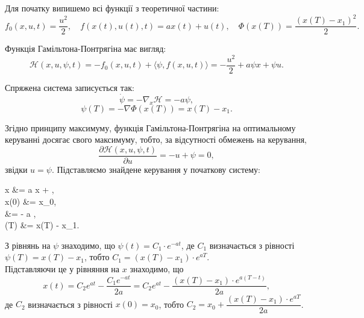 \begin{solution}
	Для початку випишемо всі функції з теоретичної частини:
	\begin{equation}
		f_0(x, u, t) = \dfrac{u^2}{2}, \quad f(x(t), u(t), t) = a x(t) + u(t), \quad \Phi(x(T)) = \dfrac{(x(T) - x_1)^2}{2}.
	\end{equation}

	Функція Гамільтона-Понтрягіна має вигляд:
	\begin{equation}
		\mathcal{H}(x, u, \psi, t) = - f_0(x, u, t) + \langle \psi, f(x, u, t) \rangle = - \dfrac{u^2}{2} + a \psi x + \psi u.
	\end{equation}

	Спряжена система записується так:
	\begin{equation}
		\dot \psi = - \nabla_x \mathcal{H} = - a \psi,
	\end{equation}
	\begin{equation}
		\psi(T) = - \nabla \Phi(x(T)) = x(T) - x_1.
	\end{equation}

	Згідно принципу максимуму, функція Гамільтона-Понтрягіна на оптимальному керуванні досягає свого максимуму, тобто, за відсутності обмежень на керування,
	\begin{equation}
		\dfrac{\partial \mathcal{H}(x, u, \psi, t)}{\partial u} = - u + \psi = 0,
	\end{equation}
	звідки $u = \psi$. Підставляємо знайдене керування у початкову систему:
	\begin{system}
		\dot x &= a x + \psi, \\
		x(0) &= x_0, \\
		\dot \psi &= - a \psi, \\
		\psi(T) &= x(T) - x_1.
	\end{system}

	З рівнянь на $\psi$ знаходимо, що $\psi(t) = C_1 \cdot e^{-a t}$, де $C_1$ визначається з рівності $\psi(T) = x(T) - x_1$, тобто $C_1 = (x(T) - x_1) \cdot e^{a T}$. \\

	Підставляючи це у рівняння на $x$ знаходимо, що 
	\begin{equation}
		x(t) = C_2 e^{a t} - \dfrac{C_1 e^{-a t}}{2 a} = C_2 e^{a t} - \dfrac{(x(T) - x_1) \cdot e^{a (T - t)}}{2 a},
	\end{equation}
	де $C_2$ визначається з рівності $x(0) = x_0$, тобто $C_2 = x_0 + \dfrac{(x(T) - x_1) \cdot e^{a T}}{2 a}$. \\


\end{solution}
